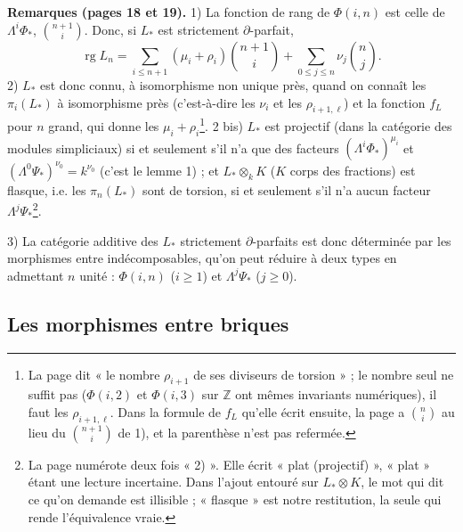 \documentclass[11pt,a4paper]{article}
\begin{document}
\textbf{Remarques (pages 18 et 19).}
1) La fonction de rang de $\Phi(i,n)$ est celle de $\Lambda^{i}\Phi_{*}$,
$\binom{n+1}{i}$. Donc, si $L_{*}$ est strictement $\partial$-parfait,
\[
  \operatorname{rg} L_{n} = \sum_{i \leqslant n+1} (\mu_{i} + \rho_{i})
  \binom{n+1}{i} + \sum_{0 \leqslant j \leqslant n} \nu_{j} \binom{n}{j} .
\]
2) $L_{*}$ est donc connu, à isomorphisme non unique près, quand on connaît
les $\pi_{i}(L_{*})$ à isomorphisme près (c'est-à-dire les $\nu_{i}$ et les
$\rho_{i+1,\ell}$) et la fonction $f_{L}$ pour $n$ grand, qui donne les
$\mu_{i} + \rho_{i}$\footnote{La page dit « le nombre $\rho_{i+1}$ de ses
diviseurs de torsion » ; le nombre seul ne suffit pas ($\Phi(i,2)$ et
$\Phi(i,3)$ sur $\mathbb{Z}$ ont mêmes invariants numériques), il faut les
$\rho_{i+1,\ell}$. Dans la formule de $f_{L}$ qu'elle écrit ensuite, la page
a $\binom{n}{i}$ au lieu du $\binom{n+1}{i}$ de 1), et la parenthèse n'est pas
refermée.}.
2 bis) $L_{*}$ est projectif (dans la catégorie des modules simpliciaux) si et
seulement s'il n'a que des facteurs $(\Lambda^{i}\Phi_{*})^{\mu_{i}}$ et
$(\Lambda^{0}\Psi_{*})^{\nu_{0}} = k^{\nu_{0}}$ (c'est le lemme 1) ; et
$L_{*} \otimes_{k} K$ ($K$ corps des fractions) est flasque, i.e. les
$\pi_{n}(L_{*})$ sont de torsion, si et seulement s'il n'a aucun facteur
$\Lambda^{j}\Psi_{*}$\footnote{La page numérote deux fois « 2) ». Elle écrit
« plat (projectif) », « plat » étant une lecture incertaine. Dans l'ajout
entouré sur $L_{*} \otimes K$, le mot qui dit ce qu'on demande est
illisible ; « flasque » est notre restitution, la seule qui rende
l'équivalence vraie.}.

3) La catégorie additive des $L_{*}$ strictement $\partial$-parfaits est donc
déterminée par les morphismes entre indécomposables, qu'on peut réduire à
deux types en admettant $n$ unité : $\Phi(i,n)$ ($i \geqslant 1$) et
$\Lambda^{j}\Psi_{*}$ ($j \geqslant 0$).

\subsection*{Les morphismes entre briques}
\end{document}
